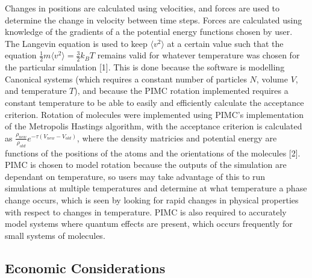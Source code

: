 \documentclass[11pt]{article}
\begin{document}
Changes in positions are calculated using velocities, and forces are used to determine the change in velocity between time steps. Forces are calculated using knowledge of the gradients of a the potential energy functions chosen by user. The Langevin equation is used to keep \begin{math} \langle v^2 \rangle \end{math} at a certain value such that the equation \begin{math} \frac{1}{2} m \langle v^2 \rangle = \frac{3}{2} k_B T \end{math} remains valid for whatever temperature was chosen for the particular simulation [1]. This is done because the software is modelling Canonical systems (which requires a constant number of particles \begin{math} N \end{math}, volume \begin{math} V \end{math}, and temperature \begin{math} T \end{math}), and because the PIMC rotation implemented requires a constant temperature to be able to easily and efficiently calculate the acceptance criterion. Rotation of molecules were implemented using PIMC's implementation of the Metropolis Hastings algorithm, with the acceptance criterion is calculated as \begin{math} \frac{\rho_{new}}{\rho_{old}} e^{- \tau ( V_{new} - V_{old} )} \end{math}, where the density matricies and potential energy are functions of the positions of the atoms and the orientations of the molecules [2]. PIMC is chosen to model rotation because the outputs of the simulation are dependant on temperature, so users may take advantage of this to run simulations at multiple temperatures and determine at what temperature a phase change occurs, which is seen by looking for rapid changes in physical properties with respect to changes in temperature. PIMC is also required to accurately model systems where quantum effects are present, which occurs frequently for small systems of molecules. 

\subsection{Economic Considerations}
\end{document}
